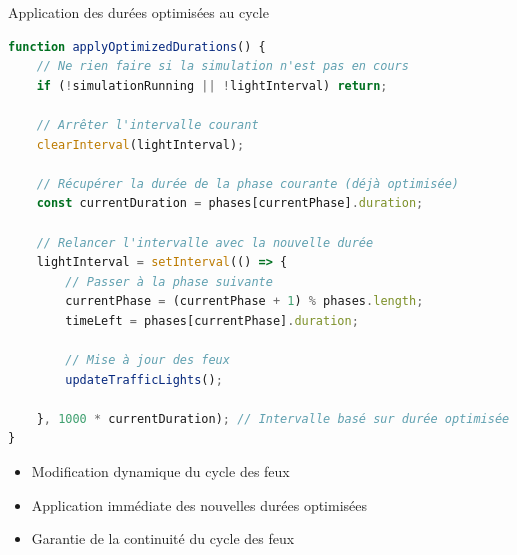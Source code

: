 \begin{frame}[fragile]{Application des durées optimisées au cycle}
  \begin{lstlisting}[language=JavaScript, basicstyle=\small]
function applyOptimizedDurations() {
    // Ne rien faire si la simulation n'est pas en cours
    if (!simulationRunning || !lightInterval) return;
    
    // Arrêter l'intervalle courant
    clearInterval(lightInterval);
    
    // Récupérer la durée de la phase courante (déjà optimisée)
    const currentDuration = phases[currentPhase].duration;
    
    // Relancer l'intervalle avec la nouvelle durée
    lightInterval = setInterval(() => {
        // Passer à la phase suivante
        currentPhase = (currentPhase + 1) % phases.length;
        timeLeft = phases[currentPhase].duration;
        
        // Mise à jour des feux
        updateTrafficLights();
        
    }, 1000 * currentDuration); // Intervalle basé sur durée optimisée
}
  \end{lstlisting}
  
  \begin{itemize}
    \item<2-> Modification dynamique du cycle des feux
    \item<3-> Application immédiate des nouvelles durées optimisées
    \item<4-> Garantie de la continuité du cycle des feux
  \end{itemize}
\end{frame}

